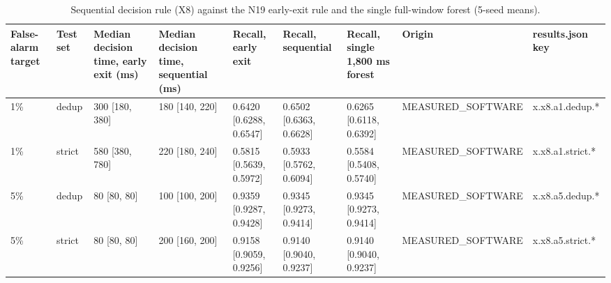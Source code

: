 \begin{table}[t]
\centering
\small
\caption{Sequential decision rule (X8) against the N19 early-exit rule and the single full-window forest (5-seed means).}
\label{tab:jp_tab_x8}
\begin{tabular}{lllllllll}
\toprule
False-alarm target & Test set & Median decision time, early exit (ms) & Median decision time, sequential (ms) & Recall, early exit & Recall, sequential & Recall, single 1,800 ms forest & Origin & results.json key \\
\midrule
1\% & dedup & 300 [180, 380] & 180 [140, 220] & 0.6420 [0.6288, 0.6547] & 0.6502 [0.6363, 0.6628] & 0.6265 [0.6118, 0.6392] & MEASURED\_SOFTWARE & x.x8.a1.dedup.* \\
1\% & strict & 580 [380, 780] & 220 [180, 240] & 0.5815 [0.5639, 0.5972] & 0.5933 [0.5762, 0.6094] & 0.5584 [0.5408, 0.5740] & MEASURED\_SOFTWARE & x.x8.a1.strict.* \\
5\% & dedup & 80 [80, 80] & 100 [100, 200] & 0.9359 [0.9287, 0.9428] & 0.9345 [0.9273, 0.9414] & 0.9345 [0.9273, 0.9414] & MEASURED\_SOFTWARE & x.x8.a5.dedup.* \\
5\% & strict & 80 [80, 80] & 200 [160, 200] & 0.9158 [0.9059, 0.9256] & 0.9140 [0.9040, 0.9237] & 0.9140 [0.9040, 0.9237] & MEASURED\_SOFTWARE & x.x8.a5.strict.* \\
\bottomrule
\end{tabular}
\end{table}
